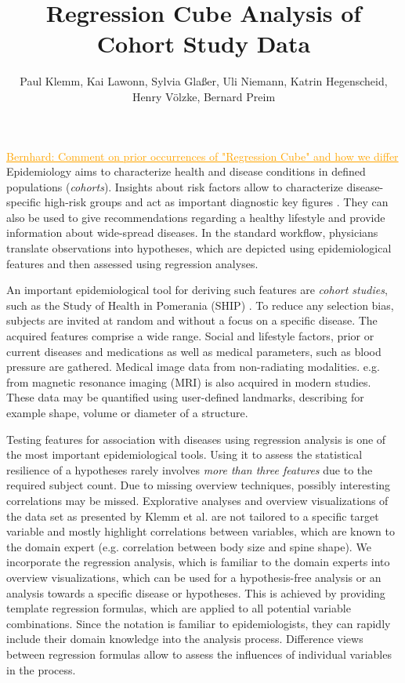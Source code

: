\documentclass[journal]{style/vgtc} 			          %
\title{Regression Cube Analysis of Cohort Study Data}
\author{Paul Klemm, Kai Lawonn, Sylvia Gla{\ss}er, Uli Niemann, Katrin Hegenscheid, Henry V{\"o}lzke, Bernard Preim}
\newcommand{\com}[1]{\textcolor{orange}{\uline{#1}}}
\begin{document}


\maketitle
\com{Bernhard: Comment on prior occurrences of "Regression Cube" and how we differ}
Epidemiology aims to characterize health and disease conditions in defined populations (\emph{cohorts}).
Insights about risk factors allow to characterize disease-specific high-risk groups and act as important diagnostic key figures \cite{Fletcher2012}.
They can also be used to give recommendations regarding a healthy lifestyle and provide information about wide-spread diseases.
In the standard workflow, physicians translate observations into hypotheses, which are depicted using epidemiological features and then assessed using regression analyses.

An important epidemiological tool for deriving such features are \emph{cohort studies}, such as the Study of Health in Pomerania (SHIP) \cite{Volzke2011}.
To reduce any selection bias, subjects are invited at random and without a focus on a specific disease.
The acquired features comprise a wide range.
%
Social and lifestyle factors, prior or current diseases and medications as well as medical parameters, such as blood pressure are gathered.
Medical image data from non-radiating modalities. e.g. from magnetic resonance imaging (MRI) is also acquired in modern studies.
These data may be quantified using user-defined landmarks, describing for example shape, volume or diameter of a structure.

Testing features for association with diseases using regression analysis is one of the most important epidemiological tools.
Using it to assess the statistical resilience of a hypotheses rarely involves \emph{more than three features} due to the required subject count.
Due to missing overview techniques, possibly interesting correlations may be missed.
Explorative analyses and overview visualizations of the data set as presented by Klemm et al. \cite{Klemm2014VIS} are not tailored to a specific target variable and mostly highlight correlations between variables, which are known to the domain expert (e.g. correlation between body size and spine shape).
We incorporate the regression analysis, which is familiar to the domain experts into overview visualizations, which can be used for a hypothesis-free analysis or an analysis towards a specific disease or hypotheses.
This is achieved by providing template regression formulas, which are applied to all potential variable combinations.
Since the notation is familiar to epidemiologists, they can rapidly include their domain knowledge into the analysis process.
Difference views between regression formulas allow to assess the influences of individual variables in the process.
\end{document}
